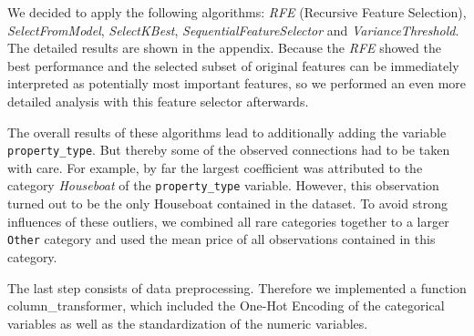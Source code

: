 \documentclass[12pt, letterpaper]{article}
\begin{document}
We decided to apply the following algorithms: \textit{RFE} (Recursive Feature Selection), \textit{SelectFromModel}, \textit{SelectKBest}, \textit{SequentialFeatureSelector} and \textit{VarianceThreshold}. The detailed results are shown in the appendix.
Because the \textit{RFE} showed the best performance and the selected subset of original features can be immediately interpreted as potentially most important features, so we performed an even more detailed analysis with this feature selector afterwards. 

The overall results of these algorithms lead to additionally adding the variable \texttt{property\_type}. But thereby some of the observed connections had to be taken with care. For example, by far the largest coefficient was attributed to the category \emph{Houseboat} of the \verb|property_type| variable.
However, this observation turned out to be the only Houseboat contained in the dataset.
To avoid strong influences of these outliers, we combined all rare categories together to a larger \texttt{Other} category and used the mean price of all observations contained in this category.






The last step consists of data preprocessing. Therefore we implemented a function column\_transformer, which included the One-Hot Encoding of the categorical variables as well as the standardization of the numeric variables. 
\end{document}
